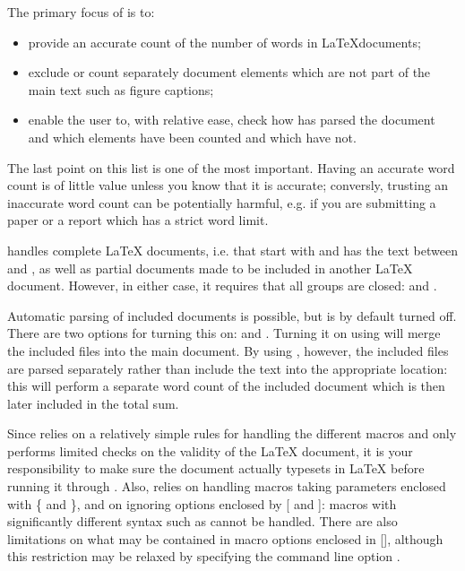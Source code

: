 \documentclass{article}
\begin{document}
The primary focus of \TeXcount{} is to:
\begin{itemize}

\item provide an accurate count of the number of words in \LaTeX documents;

\item exclude or count separately document elements which are not part of the main text such as figure captions;

\item enable the user to, with relative ease, check how \TeXcount{} has parsed the document and which elements have been counted and which have not.

\end{itemize}
The last point on this list is one of the most important. Having an accurate word count is of little value unless you know that it is accurate; conversly, trusting an inaccurate word count can be potentially harmful, e.g. if you are submitting a paper or a report which has a strict word limit.

\TeXcount{} handles complete \LaTeX{} documents, i.e. that start with  and has the text between  and , as well as partial documents made to be included in another \LaTeX{} document. However, in either case, it requires that all groups are closed: \code{\{\ldots\}} and .

Automatic parsing of included documents is possible, but is by default turned off. There are two options for turning this on:  and . Turning it on using  will merge the included files into the main document. By using , however, the included files are parsed separately rather than include the text into the appropriate location: this will perform a separate word count of the included document which is then later included in the total sum.

Since \TeXcount{} relies on a relatively simple rules for handling the different macros and only performs limited checks on the validity of the \LaTeX{} document, it is your responsibility to make sure the document actually typesets in \LaTeX{} before running it through \TeXcount{}. Also, \TeXcount{} relies on handling macros taking parameters enclosed with \{ and \}, and on ignoring options enclosed by [ and ]: macros with significantly different syntax such as  cannot be handled. There are also limitations on what may be contained in macro options enclosed in [], although this restriction may be relaxed by specifying the command line option .
\end{document}
